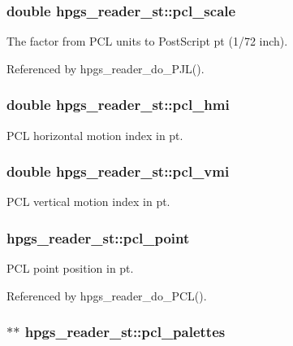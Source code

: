 \subsubsection[pcl\_\-scale]{\setlength{\rightskip}{0pt plus 5cm}double {\bf hpgs\_\-reader\_\-st::pcl\_\-scale}}\label{structhpgs__reader__st_da48ebf583e0870b81f7be402ff6f911}


The factor from PCL units to PostScript pt (1/72 inch). 

Referenced by hpgs\_\-reader\_\-do\_\-PJL().
\subsubsection[pcl\_\-hmi]{\setlength{\rightskip}{0pt plus 5cm}double {\bf hpgs\_\-reader\_\-st::pcl\_\-hmi}}\label{structhpgs__reader__st_6a1bba961dbb44a788c407f76a0e7738}


PCL horizontal motion index in pt. 
\subsubsection[pcl\_\-vmi]{\setlength{\rightskip}{0pt plus 5cm}double {\bf hpgs\_\-reader\_\-st::pcl\_\-vmi}}\label{structhpgs__reader__st_893a7337617fd19a6f48b071c378d7bf}


PCL vertical motion index in pt. 
\subsubsection[pcl\_\-point]{ {\bf hpgs\_\-reader\_\-st::pcl\_\-point}}\label{structhpgs__reader__st_b442193f453cc9e03b4bda37d7b9da0c}


PCL point position in pt. 

Referenced by hpgs\_\-reader\_\-do\_\-PCL().
\subsubsection[pcl\_\-palettes]{$\ast$$\ast$ {\bf hpgs\_\-reader\_\-st::pcl\_\-palettes}}\label{structhpgs__reader__st_0c384bda72a671d8f77975019e138847}


